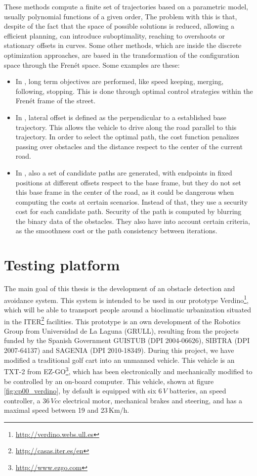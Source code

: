 These methods compute a finite set of trajectories based on a parametric model, usually polynomial functions of a given order, The problem with this is that, despite of the fact that the space of possible solutions is reduced, allowing a efficient planning, can introduce suboptimality, reaching to overshoots or stationary offsets in curves.
Some other methods, which are inside the discrete optimization approaches, are based in the transformation of the configuration space through the Fren\'et space. Some examples are these:
\begin{itemize}
 \item In \cite{werling2010optimal}, long term objectives are performed, like speed keeping, merging, following, stopping. This is done through optimal control strategies within the Fren\'et frame of the street.
 \item In \cite{thrun2006stanley}, lateral offset is defined as the perpendicular to a established base trajectory. This allows the vehicle to drive along the road parallel to this trajectory. In order to select the optimal path, the cost function penalizes passing over obstacles and the distance respect to the center of the current road.
 \item In \cite{chu2012local}, also a set of candidate paths are generated, with endpoints in fixed positions at different offsets respect to the base frame, but they do not set this base frame in the center of the road, as it could be dangerous when computing the costs at certain scenarios. Instead of that, they use a security cost for each candidate path. Security of the path is computed by blurring the binary data of the obstacles. They also have into account certain criteria, as the smoothness cost or the path consistency between iterations.
\end{itemize}

\section{Testing platform}\label{ch:chapter00_03}


The main goal of this thesis is the development of an obstacle detection and avoidance system. This system is intended to be used in our prototype Verdino\footnote{\url{http://verdino.webs.ull.es}}, which will be able to transport people around a bioclimatic urbanization situated in the ITER\footnote{\url{http://casas.iter.es/en}} facilities. This prototype is an own development of the Robotics Group from Universidad de La Laguna (GRULL), resulting from the projects funded by the Spanish Government GUISTUB (DPI 2004-06626), SIBTRA (DPI 2007-64137) and SAGENIA (DPI 2010-18349). During this project, we have modified a traditional golf cart into an unmanned vehicle. 
This vehicle is an TXT-2 from EZ-GO\footnote{\url{http://www.ezgo.com}}, which has been electronically and mechanically modified to be controlled by an on-board computer. This vehicle, shown at figure \ref{fig:cp00_verdino}, by default is equipped with six $6\,V$ batteries, an speed controller, a $36\,Vcc$ electrical motor, mechanical brakes and steering, and has a maximal speed between 19 and 23\,Km/h.

